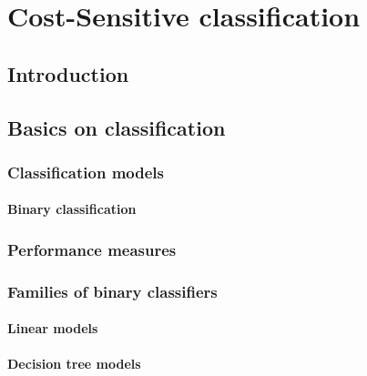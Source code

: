 \documentclass[twoside,openright,titlepage,numbers=noenddot,headinclude,%
               footinclude=true,cleardoublepage=empty,abstractoff,BCOR=5mm,%
               paper=a4,fontsize=11pt,ngerman,american]{scrreprt}
\numberwithin{theorem}{chapter}
\numberwithin{definition}{chapter}
\numberwithin{algorithm}{chapter}
\numberwithin{figure}{chapter}
\numberwithin{table}{chapter}
\numberwithin{equation}{chapter}
\begin{document}
\frenchspacing
\raggedbottom
{}
\pagestyle{plain}



\cleardoublepage
\cleardoublepage
\cleardoublepage
\cleardoublepage
\cleardoublepage
\pagestyle{scrheadings}
\cleardoublepage





\part{Cost-Sensitive classification}

	\chapter{Introduction}

	\chapter{Basics on classification}
		\section{Classification models}
			\subsection{Binary classification}
		\section{Performance measures}
		\section{Families of binary classifiers}
			\subsection{Linear models}
			\subsection{Decision tree models}
\end{document}
